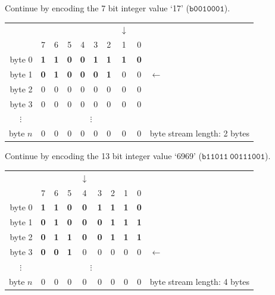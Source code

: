 \documentclass[9pt,letterpaper]{book}
\newcommand{\bin}[1]{\ensuremath{\mathtt{b#1}}}
\numberwithin{equation}{chapter}
\numberwithin{figure}{chapter}
\numberwithin{table}{chapter}
\begin{document}
Continue by encoding the 7 bit integer value `17' (\bin{0010001}).

\begin{tabular}{r|ccccccccl}
\multicolumn{1}{r}{} &&&&&&&$\downarrow$&& \\
         & 7 & 6 & 5 & 4 & 3 & 2 & 1 & 0 & \\\cline{1-9}
byte 0   & \textbf{1} & \textbf{1} & \textbf{0} & \textbf{0} &
           \textbf{1} & \textbf{1} & \textbf{1} & \textbf{0} & \\
byte 1   & \textbf{0} & \textbf{1} & \textbf{0} & \textbf{0} &
           \textbf{0} & \textbf{1} & 0 & 0 & $\leftarrow$      \\
byte 2   & 0 & 0 & 0 & 0 & 0 & 0 & 0 & 0 &                     \\
byte 3   & 0 & 0 & 0 & 0 & 0 & 0 & 0 & 0 &                     \\
\multicolumn{1}{c|}{$\vdots$}&\multicolumn{8}{c}{$\vdots$}&    \\
byte $n$ & 0 & 0 & 0 & 0 & 0 & 0 & 0 & 0 &
byte stream length: 2 bytes
\end{tabular}
\vspace{\baselineskip}

Continue by encoding the 13 bit integer value `6969' (\bin{11011\ 00111001}).

\begin{tabular}{r|ccccccccl}
\multicolumn{1}{r}{} &&&&$\downarrow$&&&&& \\
         & 7 & 6 & 5 & 4 & 3 & 2 & 1 & 0 &            \\\cline{1-9}
byte 0   & \textbf{1} & \textbf{1} & \textbf{0} & \textbf{0} &
           \textbf{1} & \textbf{1} & \textbf{1} & \textbf{0} & \\
byte 1   & \textbf{0} & \textbf{1} & \textbf{0} & \textbf{0} &
           \textbf{0} & \textbf{1} & \textbf{1} & \textbf{1} & \\
byte 2   & \textbf{0} & \textbf{1} & \textbf{1} & \textbf{0} &
           \textbf{0} & \textbf{1} & \textbf{1} & \textbf{1} & \\
byte 3   & \textbf{0} & \textbf{0} & \textbf{1} &
                       0 & 0 & 0 & 0 & 0 & $\leftarrow$        \\
\multicolumn{1}{c|}{$\vdots$}&\multicolumn{8}{c}{$\vdots$}&    \\
byte $n$ & 0 & 0 & 0 & 0 & 0 & 0 & 0 & 0 &
byte stream length: 4 bytes
\end{tabular}
\vspace{\baselineskip}
\end{document}
